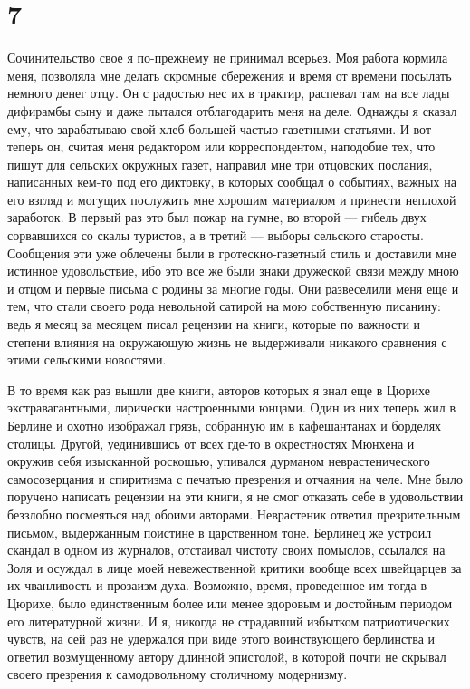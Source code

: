 \section*{7}


Сочинительство  свое я  по-прежнему  не принимал  всерьез. Моя  работа
кормила  меня, позволяла  мне делать  скромные сбережения  и время  от
времени посылать немного  денег отцу. Он с радостью нес  их в трактир,
распевал там на  все лады дифирамбы сыну и  даже пытался отблагодарить
меня на деле. Однажды я сказал  ему, что зарабатываю свой хлеб большей
частью газетными статьями. И вот теперь он, считая меня редактором или
корреспондентом, наподобие тех, что пишут для сельских окружных газет,
направил  мне  три  отцовских  послания,  написанных  кем-то  под  его
диктовку, в которых сообщал о событиях, важных на его взгляд и могущих
послужить  мне хорошим  материалом  и принести  неплохой заработок.  В
первый  раз  это  был  пожар  на гумне,  во  второй  ---  гибель  двух
сорвавшихся  со  скалы  туристов,  а в  третий  ---  выборы  сельского
старосты. Сообщения эти уже облечены были в гротескно-газетный стиль и
доставили  мне  истинное  удовольствие,  ибо это  все  же  были  знаки
дружеской связи между мною и отцом  и первые письма с родины за многие
годы. Они развеселили меня еще и  тем, что стали своего рода невольной
сатирой на  мою собственную  писанину: ведь я  месяц за  месяцем писал
рецензии на книги, которые по важности и степени влияния на окружающую
жизнь не выдерживали никакого сравнения с этими сельскими новостями.

В то  время как  раз вышли  две книги,  авторов которых  я знал  еще в
Цюрихе экстравагантными,  лирически настроенными  юнцами. Один  из них
теперь  жил  в  Берлине  и  охотно изображал  грязь,  собранную  им  в
кафешантанах и борделях столицы. Другой,  уединившись от всех где-то в
окрестностях  Мюнхена и  окружив  себя  изысканной роскошью,  упивался
дурманом  неврастенического  самосозерцания  и  спиритизма  с  печатью
презрения  и отчаяния  на челе.  Мне было  поручено написать  рецензии
на  эти  книги, я  не  смог  отказать  себе в  удовольствии  беззлобно
посмеяться  над  обоими  авторами. Неврастеник  ответил  презрительным
письмом, выдержанным поистине в  царственном тоне. Берлинец же устроил
скандал  в  одном  из  журналов,  отстаивал  чистоту  своих  помыслов,
ссылался на Золя  и осуждал в лице моей  невежественной критики вообще
всех швейцарцев  за их чванливость  и прозаизм духа.  Возможно, время,
проведенное  им тогда  в  Цюрихе, было  единственным  более или  менее
здоровым и достойным периодом его  литературной жизни. И я, никогда не
страдавший избытком патриотических чувств, на сей раз не удержался при
виде  этого воинствующего  берлинства  и  ответил возмущенному  автору
длинной  эпистолой, в  которой  почти не  скрывал  своего презрения  к
самодовольному столичному модернизму.

